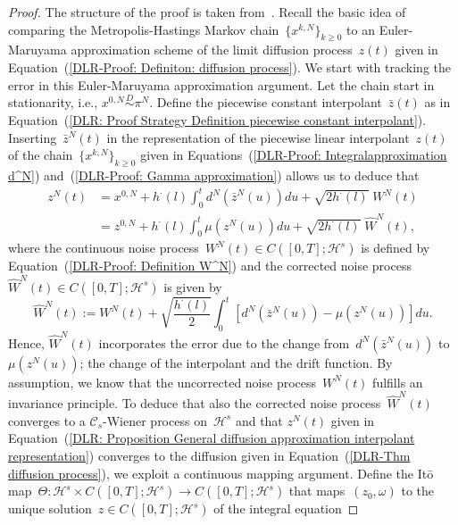 \begin{proof}
  The structure of the proof is taken from~\autocite[Proposition 3.1]{Pillai2012}.  Recall the basic idea of comparing the Metropolis-Hastings Markov chain~$\{ x^{k,N} \}_{k \geq 0}$ to an Euler-Maruyama approximation scheme of the limit diffusion process~$z(t)$ given in Equation~(\ref{DLR-Proof: Definiton: diffusion process}). We start with tracking  the error in this Euler-Maruyama approximation argument. Let the chain start in stationarity, i.e., $x^{0,N} \stackrel{D}{\sim} \pi^N$. Define the piecewise constant interpolant~$\bar{z}(t)$ as in Equation~(\ref{DLR: Proof Strategy Definition piecewise constant interpolant}). Inserting~$\bar{z}^N(t)$ in the representation of the piecewise linear interpolant~$z(t)$ of the chain~$\{ x^{k,N} \}_{k \geq 0}$ given in Equations~(\ref{DLR-Proof: Integralapproximation d^N}) and~(\ref{DLR-Proof: Gamma approximation}) allows us to deduce that
  \begin{equation}
    \label{DLR: Proposition General diffusion approximation interpolant representation}
    \begin{split}
      z^N(t) & = x^{0,N} + h^{\cdot}(l) \int_0^t d^N(\bar{z}^N(u)) du + \sqrt{2 h^{\cdot}(l)} \; W^N(t) \\
      & = z^{0,N} + h^{\cdot}(l) \int_0^t \mu(z^N(u)) du + \sqrt{2 h^{\cdot}(l)} \;\widehat{W}^N(t),
    \end{split}
  \end{equation} 
  where the continuous noise process~$W^N(t) \in C([0,T]; \mathcal{H}^s)$ is defined by Equation~(\ref{DLR-Proof: Definition W^N}) and the corrected noise process~$\widehat{W}^N(t)\in C([0,T]; \mathcal{H}^s) $ is given by
  \begin{equation}
    \widehat{W}^N(t) :=  W^N(t) + \sqrt{\frac{h^{\cdot}(l)}{2}} \int_0^t [d^N(\bar{z}^N(u)) - \mu(z^N(u))] du.
  \end{equation}
  Hence, $\widehat{W}^N(t)$ incorporates the error due to the change from~$d^N(\bar{z}^N(u))$ to $\mu(z^N(u))$; the change of the interpolant and the drift function. By assumption, we know that the uncorrected noise process~$W^N(t)$ fulfills an invariance principle. To deduce that also the corrected noise process~$\widehat{W}^N(t)$ converges to a $\mathcal{C}_s$-Wiener process on~$\mathcal{H}^s$ and that $z^N(t)$ given in Equation~(\ref{DLR: Proposition General diffusion approximation interpolant representation}) converges to the diffusion given in Equation~(\ref{DLR-Thm diffusion process}), we exploit a continuous mapping argument. Define the It\={o} map~$\Theta : \mathcal{H}^s \times C([0,T]; \mathcal{H}^s) \to  C([0,T]; \mathcal{H}^s)$ that maps~$(z_0, \omega) $ to the unique solution~$z \in  C([0,T]; \mathcal{H}^s)$ of the integral equation

\end{proof}

